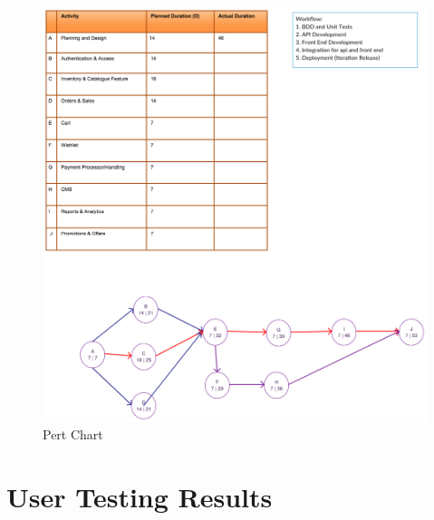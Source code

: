 \documentclass{report}
\begin{document}
\begin{figure}[h!]
\includegraphics[width=\linewidth]{Diagrams/PertChart.png}
\caption{Pert Chart}
\label{fig:PertChart}
\end{figure}


\chapter{User Testing Results}
\end{document}
